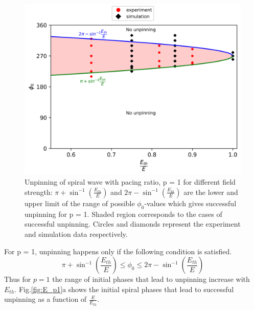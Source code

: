 \begin{figure}[htb!]
    \centering
    \includegraphics{p1.png}
    \caption{Unpinning of spiral wave with pacing ratio, p = 1 for different
	field strength: $\pi+{\sin^{-1}}{(\frac{E_{th}}{E})}$ and
	$2\pi-{\sin^{-1}}{(\frac{E_{th}}{E})}$ are the lower and upper limit of
	the range of possible ${\phi}_0$-values which gives successful
	unpinning for p = 1. Shaded region corresponds to the cases of
	successful unpinning.
    Circles and diamonds represent the experiment and simulation data
	respectively.} \label{fig:unpinning_p1}
\end{figure}
\fi
For p = 1, unpinning happens only if the following condition is satisfied.
\begin{equation}
\pi+ \sin^{-1}(\frac{E_{th}}{E})  \leq \phi_0 \leq 2\pi-\sin^{-1}(\frac{E_{th}}{E})
\label{eq:p=1}
\end{equation} 
Thus for $p=1$ the range of initial phases that lead to
unpinning increase with $E_{th}$. Fig.\ref{fig:E_p1}a shows the initial spiral
phases that lead to successful unpinning as a function of $\frac{E}{E_{th}}$.




